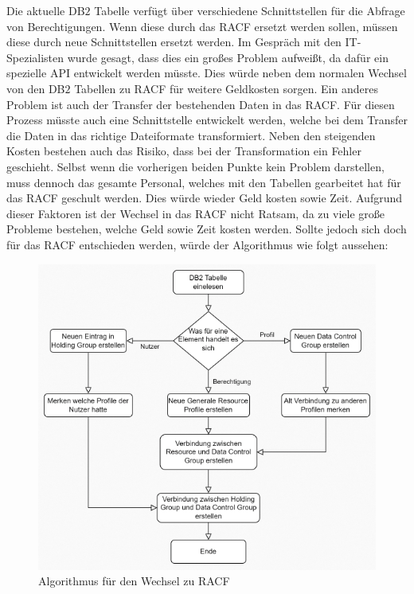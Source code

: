 Die aktuelle DB$2$ Tabelle verfügt über verschiedene Schnittstellen für die Abfrage von Berechtigungen.
Wenn diese durch das \ac{RACF} ersetzt werden sollen, müssen diese durch neue Schnittstellen ersetzt werden.
Im Gespräch mit den IT-Spezialisten wurde gesagt, dass dies ein großes Problem aufweißt, da dafür ein spezielle \ac{API} entwickelt werden müsste.
Dies würde neben dem normalen Wechsel von den DB$2$ Tabellen zu \ac{RACF} für weitere Geldkosten sorgen.
\newline
Ein anderes Problem ist auch der Transfer der bestehenden Daten in das \ac{RACF}.
Für diesen Prozess müsste auch eine Schnittstelle entwickelt werden, welche bei dem Transfer die Daten in das richtige Dateiformate transformiert.
Neben den steigenden Kosten bestehen auch das Risiko, dass bei der Transformation ein Fehler geschieht.
\newline
Selbst wenn die vorherigen beiden Punkte kein Problem darstellen, muss dennoch das gesamte Personal, welches mit den Tabellen gearbeitet hat für das \ac{RACF} geschult werden.
Dies würde wieder Geld kosten sowie Zeit.
Aufgrund dieser Faktoren ist der Wechsel in das \ac{RACF} nicht Ratsam, da zu viele große Probleme bestehen, welche Geld sowie Zeit kosten werden.
\newline
Sollte jedoch sich doch für das \ac{RACF} entschieden werden, würde der Algorithmus wie folgt aussehen:
\begin{figure}[h!]
 \centering
 \includegraphics[width=1\textwidth]{gfx/Picture/racf.PNG}
 \caption{Algorithmus für den Wechsel zu RACF}
 \label{fig:racf}
\end{figure}